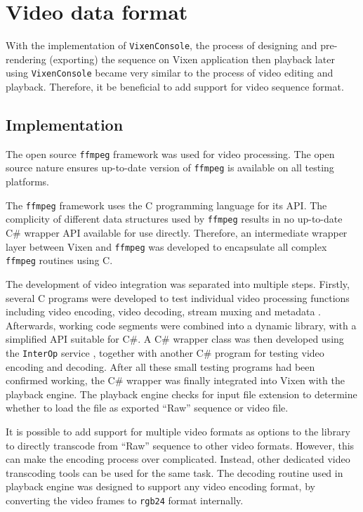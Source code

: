 \section{Video data format}

With the implementation of \texttt{VixenConsole}, the process of designing and pre-rendering (exporting) the sequence on Vixen application then playback later using \texttt{VixenConsole} became very similar to the process of video editing and playback. Therefore, it  be beneficial to add support for video sequence format.

\subsection{Implementation}

The open source \texttt{ffmpeg} framework \cite{ffmpeg} was used for video processing. The open source nature ensures up-to-date version of \texttt{ffmpeg} is available on all testing platforms.

The \texttt{ffmpeg} framework uses the C programming language for its API. The complicity of different data structures used by \texttt{ffmpeg} results in no up-to-date C\# wrapper API available for use directly. Therefore, an intermediate wrapper layer between Vixen and \texttt{ffmpeg} was developed to encapsulate all complex \texttt{ffmpeg} routines using C.

The development of video integration was separated into multiple steps. Firstly, several C programs were developed to test individual video processing functions including video encoding, video decoding, stream muxing and metadata . Afterwards, working code segments were combined into a dynamic library, with a simplified API suitable for C\#. A C\# wrapper class was then developed using the \texttt{InterOp} service \cite{interop}, together with another C\# program for testing video encoding and decoding. After all these small testing programs had been confirmed working, the C\# wrapper was finally integrated into Vixen with the playback engine. The playback engine checks for  input file extension to determine whether to load the file as  exported ``Raw'' sequence or  video file.

 It is possible to add support for multiple video formats as options to the  library to directly transcode from ``Raw'' sequence to other video  formats. However, this can make the encoding process  over complicated. Instead, other dedicated video transcoding tools can be used for the same task. The decoding routine used in  playback engine was designed to support any video encoding format, by converting the video frames to \texttt{rgb24} format internally.


